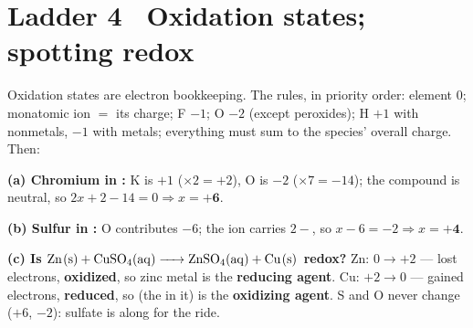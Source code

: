 \documentclass{apchem-worksheet}
\begin{document}
\section*{\sffamily Ladder 4 \textbullet\ Oxidation states; spotting
redox}

Oxidation states are electron bookkeeping. The rules, in priority order:
element 0; monatomic ion $=$ its charge; F $-1$; O $-2$ (except
peroxides); H $+1$ with nonmetals, $-1$ with metals; everything must sum
to the species' overall charge. Then:

\begin{center}
\end{center}

\begin{workedexample}
\textbf{(a) Chromium in :} K is $+1$ ($\times 2 = +2$), O is
$-2$ ($\times 7 = -14$); the compound is neutral, so
$2x + 2 - 14 = 0 \Rightarrow x = \mathbf{+6}$.

\textbf{(b) Sulfur in :} O contributes $-6$; the ion carries
$2-$, so $x - 6 = -2 \Rightarrow x = \mathbf{+4}$.

\textbf{(c) Is $\ce{Zn(s) + CuSO4(aq) -> ZnSO4(aq) + Cu(s)}$ redox?}
Zn: $0 \to +2$ --- lost electrons, \textbf{oxidized}, so zinc metal is
the \textbf{reducing agent}. Cu: $+2 \to 0$ --- gained electrons,
\textbf{reduced}, so  (the  in it) is the
\textbf{oxidizing agent}. S and O never change ($+6$, $-2$): sulfate is
along for the ride.
\end{workedexample}
\end{document}
